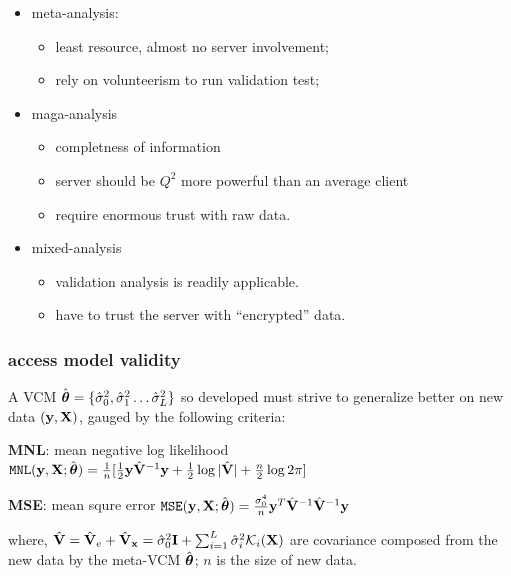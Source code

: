 \documentclass{beamer}
\begin{document}
\begin{frame}
  \begin{itemize}\frametitle{logistical concern, summarize}
  \item meta-analysis:
    \begin{itemize}
    \item least resource, almost no server involvement;
    \item rely on volunteerism to run validation test;
    \end{itemize}
  \item maga-analysis
    \begin{itemize}
    \item completness of information
    \item server should be $Q^2$ more powerful than an average client
    \item require enormous trust with raw data.
    \end{itemize}
  \item mixed-analysis
    \begin{itemize}
    \item validation analysis is readily applicable.
    \item have to trust the server with ``encrypted'' data.
    \end{itemize}
  \end{itemize}
\end{frame}
\begin{frame}\frametitle{access model validity}
  A VCM
  $\hat{\boldsymbol{\theta}}=\{\hat{\sigma}^2_0, \hat{\sigma}^2_1 \dots
  \hat{\sigma}^2_L\}$ so developed must strive to generalize better on
  new data $(\mathbf{y}, \mathbf{X})$, gauged by the following criteria:
  \begin{block}{\textbf{MNL}: mean negative log likelihood}
    $\mathtt{MNL}(\mathbf{y}, \mathbf{X}; \hat{\boldsymbol{\theta}}) = \frac{1}{n}
    [\frac{1}{2}\mathbf{y}\hat{\mathbf{V}}^{-1}\mathbf{y} + \frac{1}{2}\log{|\hat{\mathbf{V}}|} +
    \frac{n}{2}\log{2\pi}]$
  \end{block}
  \begin{block}{\textbf{MSE}: mean squre error}
    $\mathtt{MSE}(\mathbf{y}, \mathbf{X}; \hat{\boldsymbol{\theta}}) = \frac{\sigma_0^4}{n}
    \mathbf{y}^T\hat{\mathbf{V}}^{-1} \hat{\mathbf{V}}^{-1}\mathbf{y}$
  \end{block}
  where,
  $\hat{\mathbf{V}} = \hat{\mathbf{V}}_e + \hat{\mathbf{V}}_\mathbf{x} = \hat{\sigma}^2_0\textbf{I} +
  \sum_{i=1}^L\hat{\sigma}_i^2 \mathcal{K}_i(\mathbf{X})$ are covariance
  composed from the new data by the meta-VCM $\hat{\boldsymbol{\theta}}$; $n$ is
  the size of new data.
\end{frame}
\end{document}
